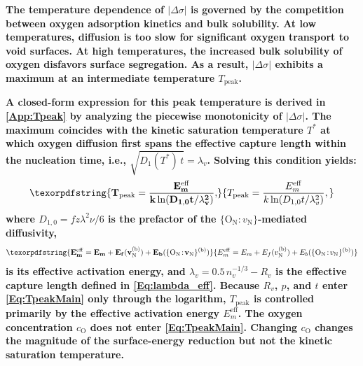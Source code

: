 \documentclass[preprint,12pt,sort&compress]{elsarticle}
\newcommand{\?}{\stackrel{?}{=}}
\providecommand{\DIFaddtex}[1]{{\bf #1}} %
\providecommand{\DIFdeltex}[1]{} %
\providecommand{\DIFaddbegin}{\protect\color{blue}} %
\providecommand{\DIFaddend}{\protect\color{black}} %
\providecommand{\DIFdelbegin}{\protect\color{red}} %
\providecommand{\DIFdelend}{\protect\color{black}} %
\providecommand{\DIFadd}[1]{\texorpdfstring{\DIFaddtex{#1}}{#1}} %
\providecommand{\DIFdel}[1]{\texorpdfstring{\DIFdeltex{#1}}{}} %
\begin{document}
\DIFaddbegin \DIFadd{The temperature dependence of $|\Delta\sigma|$ is governed by the competition between oxygen adsorption kinetics and bulk solubility. At low temperatures, diffusion is too slow for significant oxygen transport to void surfaces. At high temperatures, the increased bulk solubility of oxygen disfavors surface segregation. As a result, $|\Delta\sigma|$ exhibits a maximum at an intermediate temperature $T_\text{peak}$.
}\DIFaddend 

\DIFdelbegin \DIFdel{For the }\DIFdelend \DIFaddbegin \DIFadd{A closed-form expression for this peak temperature is derived in \ref{App:Tpeak} by analyzing the piecewise monotonicity of $|\Delta\sigma|$. The maximum coincides with the kinetic saturation temperature $T^*$ at which oxygen diffusion first spans the effective capture length within the nucleation time, i.e., $\sqrt{D_1(T^*)\,t} = \lambda_v$. Solving this condition yields:
}\begin{equation}
\DIFadd{T_\text{peak} = \frac{ E_m^\mathrm{eff} }{ k\ln\!\left( D_{1,0}t/\lambda_v^2 \right) },
\label{Eq:TpeakMain}
}\end{equation}
\DIFadd{where $D_{1,0} = f z \lambda^2 \nu/6$ is the prefactor of the $\{\text{O}_\text{N} \! : \! v_\text{N}\}$-mediated diffusivity,
}\begin{equation}
\DIFadd{E_m^\mathrm{eff} = E_m + E_f(v_\text{N}^{(\text{b})}) + E_b(\{\text{O}_\text{N} \! : \! v_\text{N}\}^{(\text{b})})   
}\end{equation}
\DIFadd{is its effective activation energy, and $\lambda_v = 0.5\,n_v^{-1/3}-R_v$ is the effective capture length defined in \cref{Eq:lambda_eff}. Because $R_v$, $p$, and $t$ enter \cref{Eq:TpeakMain} only through the logarithm, $T_\text{peak}$ is controlled primarily by the effective activation energy $E_m^\mathrm{eff}$. The oxygen concentration $c_\text{O}$ does not enter \cref{Eq:TpeakMain}. Changing $c_\text{O}$ changes the magnitude of the surface-energy reduction but not the kinetic saturation temperature.
}
\end{document}
